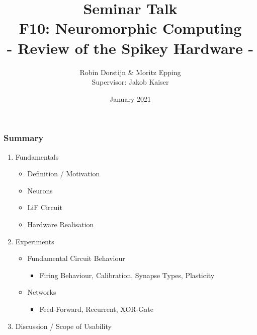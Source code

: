 \documentclass{beamer}
\title{Seminar Talk \\ F10: Neuromorphic Computing\\ 
- Review of the Spikey Hardware - }
\author{Robin Dorstijn \& Moritz Epping \\ Supervisor: Jakob Kaiser}
\institute{Universität Heidelberg}
\date{January 2021}
\begin{document}
\expandafter\def\expandafter\insertshorttitle\expandafter{%
  \insertshorttitle\hfill%
  \insertframenumber\,/\,\inserttotalframenumber}
  
  
\frame{\titlepage}

\begin{frame}
    \frametitle{Summary}
    \begin{enumerate}
        \item Fundamentals
        \begin{itemize}
        		\item Definition / Motivation
        		\item Neurons
        		\item LiF Circuit
        		\item Hardware Realisation
        \end{itemize}
        \item Experiments
        \begin{itemize}
        		\item Fundamental Circuit Behaviour
        		\begin{itemize}
        			\item Firing Behaviour,  Calibration,  Synapse Types,  Plasticity 
        		\end{itemize}
        		\item Networks
        		\begin{itemize}
        			\item Feed-Forward,  Recurrent,  XOR-Gate
        		\end{itemize}
        \end{itemize}
        \item Discussion / Scope of Usability
    \end{enumerate}
\end{frame}
\end{document}
